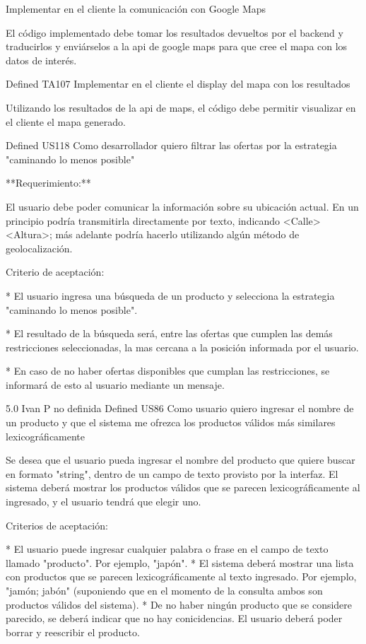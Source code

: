		{Implementar en el cliente la comunicación con Google Maps} %
		{El código implementado debe tomar los resultados devueltos por el backend y
traducirlos y enviárselos a la api de google maps para que cree el mapa con
los datos de interés.

} %
		{} %
		{} %
		{} %
		{Defined} %
	\task
		{TA107} %
		{Implementar en el cliente el display del mapa con los resultados} %
		{Utilizando los resultados de la api de maps, el código debe permitir
visualizar en el cliente el mapa generado.

} %
		{} %
		{} %
		{} %
		{Defined} %
\userStory
	{US118} %
	{Como desarrollador quiero filtrar las ofertas por la estrategia "caminando lo menos posible"} %
	{**Requerimiento:**

El usuario debe poder comunicar la información sobre su ubicación actual. En
un principio podría transmitirla directamente por texto, indicando
<Calle><Altura>; más adelante podría hacerlo utilizando algún método de
geolocalización.

  

  

Criterio de aceptación:

  
* El usuario ingresa una búsqueda de un producto y selecciona la estrategia "caminando lo menos posible".  

* El resultado de la búsqueda será, entre las ofertas que cumplen las demás restricciones seleccionadas, la mas cercana a la posición informada por el usuario.

* En caso de no haber ofertas disponibles que cumplan las restricciones, se informará de esto al usuario mediante un mensaje. 

  

  

} %
	{} %
	{5.0} %
	{Ivan P} %
	{no definida} %
	{Defined} %
\userStory
	{US86} %
	{Como usuario quiero ingresar el nombre de un producto y que el sistema me ofrezca los productos válidos más similares lexicográficamente} %
	{Se desea que el usuario pueda ingresar el nombre del producto que quiere
buscar en formato "string", dentro de un campo de texto provisto por la
interfaz. El sistema deberá mostrar los productos válidos que se parecen
lexicográficamente al ingresado, y el usuario tendrá que elegir uno.

  
Criterios de aceptación:

* El usuario puede ingresar cualquier palabra o frase en el campo de texto llamado "producto". Por ejemplo, "japón".  
* El sistema deberá mostrar una lista con productos que se parecen lexicográficamente al texto ingresado. Por ejemplo, "jamón; jabón" (suponiendo que en el momento de la consulta ambos son productos válidos del sistema).  
* De no haber ningún producto que se considere parecido, se deberá indicar que no hay conicidencias. El usuario deberá poder borrar y reescribir el producto.

} %
